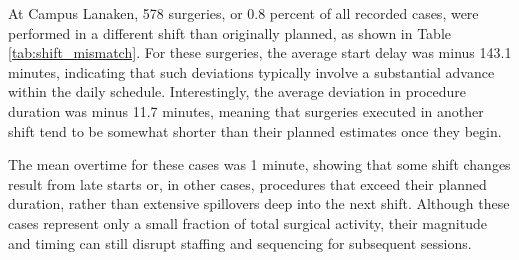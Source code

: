 \documentclass[
]{article}
\begin{document}
At Campus Lanaken, 578 surgeries, or 0.8 percent of all recorded cases,
were performed in a different shift than originally planned, as shown in
Table \ref{tab:shift_mismatch}. For these surgeries, the average start
delay was minus 143.1 minutes, indicating that such deviations typically
involve a substantial advance within the daily schedule. Interestingly,
the average deviation in procedure duration was minus 11.7 minutes,
meaning that surgeries executed in another shift tend to be somewhat
shorter than their planned estimates once they begin.

The mean overtime for these cases was 1 minute, showing that some shift
changes result from late starts or, in other cases, procedures that
exceed their planned duration, rather than extensive spillovers deep
into the next shift. Although these cases represent only a small
fraction of total surgical activity, their magnitude and timing can
still disrupt staffing and sequencing for subsequent sessions.
\end{document}
